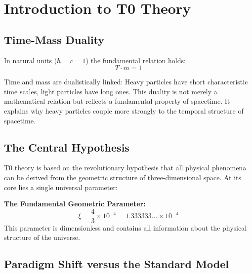 	
	\section{Introduction to T0 Theory}
	
	\subsection{Time-Mass Duality}
	
	In natural units ($\hbar = c = 1$) the fundamental relation holds:
	\begin{equation}
		T \cdot m = 1
		\label{eq:time_mass_duality}
	\end{equation}
	
	Time and mass are dualistically linked: Heavy particles have short characteristic time scales, light particles have long ones. This duality is not merely a mathematical relation but reflects a fundamental property of spacetime. It explains why heavy particles couple more strongly to the temporal structure of spacetime.
	
	\subsection{The Central Hypothesis}
	
	T0 theory is based on the revolutionary hypothesis that all physical phenomena can be derived from the geometric structure of three-dimensional space. At its core lies a single universal parameter:
	
	\begin{foundation}
		\textbf{The Fundamental Geometric Parameter:}
		\begin{equation}
			\boxed{\xi = \frac{4}{3} \times 10^{-4} = 1.333333\dots \times 10^{-4}}
			\label{eq:xi_fundamental}
		\end{equation}
		This parameter is dimensionless and contains all information about the physical structure of the universe.
	\end{foundation}
	
	\subsection{Paradigm Shift versus the Standard Model}
	
